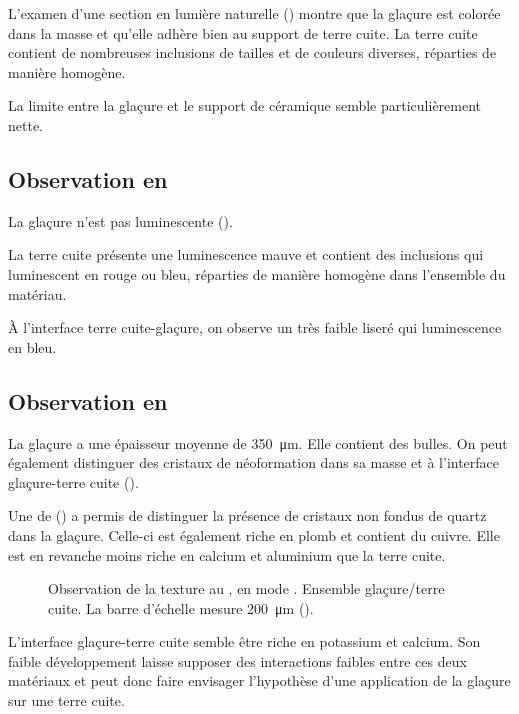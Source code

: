 L'examen d'une section en lumière naturelle 
() montre que la glaçure est colorée dans 
la masse et qu'elle adhère bien au support de terre cuite. La terre 
cuite contient de nombreuses inclusions de tailles et de couleurs 
diverses, réparties de manière homogène.

La limite entre la glaçure et le support de céramique semble 
particulièrement nette.

\subsection{Observation en \CL}
La glaçure n'est pas luminescente ().

La terre cuite présente une luminescence mauve et contient des 
inclusions qui luminescent en rouge ou bleu, réparties de manière 
homogène dans l'ensemble du matériau.

À l'interface terre cuite-glaçure, on observe un très faible liseré 
qui luminescence en bleu.

\subsection{Observation en \MEB[ie]}
La glaçure a une épaisseur moyenne de \SI{350}{\um}. Elle contient des 
bulles. On peut également distinguer des cristaux de néoformation dans 
sa masse et à l'interface glaçure-terre cuite 
().

Une \carto de \RX () a permis de distinguer la présence de cristaux non fondus de quartz dans la glaçure. Celle-ci est également riche en plomb et contient du cuivre. Elle est en revanche moins riche en calcium et aluminium que la terre cuite.

\begin{figure}[htb]
  \caption[\ -- Observation de la texture au \MEB, 
           en mode \ERD. Ensemble glaçure/terre cuite]
          {\legendeA
           Observation de la texture au \MEB, en mode \ERD. 
           Ensemble glaçure/terre cuite. La barre d'échelle mesure 
           \SI{200}{\um} ().}
  \label{MEB:6528_img}
\end{figure}

L'interface glaçure-terre cuite semble être riche en potassium et 
calcium. Son faible développement laisse supposer des interactions 
faibles entre ces deux matériaux  et peut donc faire envisager 
l'hypothèse d'une application de la glaçure sur une terre cuite.

